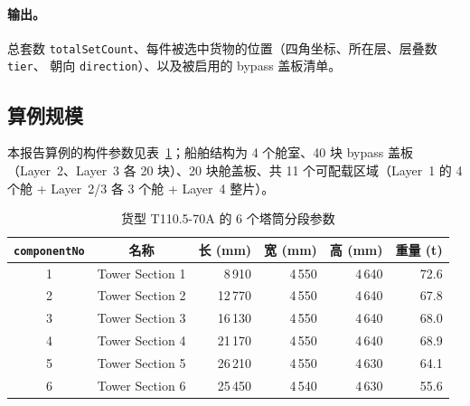 \documentclass[11pt]{article}
\begin{document}
\paragraph{输出。}
总套数 \texttt{totalSetCount}、每件被选中货物的位置（四角坐标、所在层、层叠数 \texttt{tier}、
朝向 \texttt{direction}）、以及被启用的 bypass 盖板清单。

\subsection{算例规模}
本报告算例的构件参数见表~\ref{tab:cargo}；船舶结构为 4 个舱室、40 块 bypass 盖板
（Layer~2、Layer~3 各 20 块）、20 块舱盖板、共 11 个可配载区域（Layer~1 的 4 个舱 + Layer~2/3 各 3 个舱 + Layer~4 整片）。

\begin{table}[ht]
\centering
\caption{货型 T110.5-70A 的 6 个塔筒分段参数}
\label{tab:cargo}
\begin{tabular}{ccrrrr}
\toprule
\texttt{componentNo} & 名称 & 长 (mm) & 宽 (mm) & 高 (mm) & 重量 (t) \\
\midrule
1 & Tower Section 1 & 8\,910  & 4\,550 & 4\,640 & 72.6 \\
2 & Tower Section 2 & 12\,770 & 4\,550 & 4\,640 & 67.8 \\
3 & Tower Section 3 & 16\,130 & 4\,550 & 4\,640 & 68.0 \\
4 & Tower Section 4 & 21\,170 & 4\,550 & 4\,640 & 68.9 \\
5 & Tower Section 5 & 26\,210 & 4\,550 & 4\,630 & 64.1 \\
6 & Tower Section 6 & 25\,450 & 4\,540 & 4\,630 & 55.6 \\
\bottomrule
\end{tabular}
\end{table}
\end{document}
